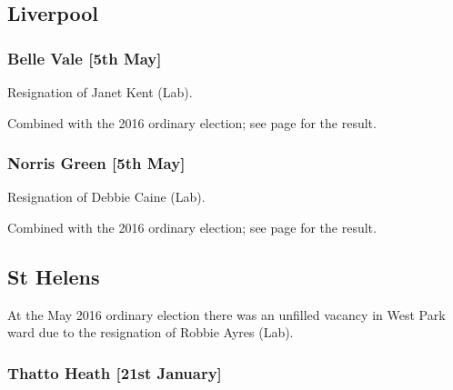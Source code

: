 \documentclass[a4paper,openany]{book}
\begin{document}
\begin{resultsiii}
\subsection*{Liverpool}

\subsubsection*{Belle Vale \hspace*{\fill}\nolinebreak[1]%
\enspace\hspace*{\fill}
[5th May]}


Resignation of Janet Kent (Lab).

Combined with the 2016 ordinary election; see page \pageref{BelleValeLiverpool} for the result.

\subsubsection*{Norris Green \hspace*{\fill}\nolinebreak[1]%
\enspace\hspace*{\fill}
[5th May]}


Resignation of Debbie Caine (Lab).

Combined with the 2016 ordinary election; see page \pageref{NorrisGreenLiverpool} for the result.

\subsection*{St Helens}

At the May 2016 ordinary election there was an unfilled vacancy in West Park ward due to the resignation of Robbie Ayres (Lab).

\subsubsection*{Thatto Heath \hspace*{\fill}\nolinebreak[1]%
\enspace\hspace*{\fill}
[21st January]}



\end{resultsiii}
\end{document}
